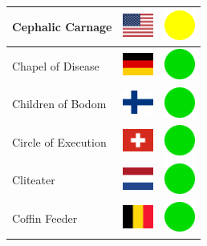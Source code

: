 \documentclass[12pt, a4paper, twoside]{report}
\begin{document}
\begin{center}
\begin{longtable}{|p{5cm}|p{2cm}|p{2cm}|}
 Cephalic Carnage                                           & \includegraphics[width=1cm]{4x3/us} &   \includegraphics[width=1cm]{likes/m} \\ \hline
 Chapel of Disease                                          & \includegraphics[width=1cm]{4x3/de} &   \includegraphics[width=1cm]{likes/y} \\ \hline
 Children of Bodom                                          & \includegraphics[width=1cm]{4x3/fi} &   \includegraphics[width=1cm]{likes/y} \\ \hline
 Circle of Execution                                        & \includegraphics[width=1cm]{4x3/ch} &   \includegraphics[width=1cm]{likes/y} \\ \hline
 Cliteater                                                  & \includegraphics[width=1cm]{4x3/nl} &   \includegraphics[width=1cm]{likes/y} \\ \hline
 Coffin Feeder                                              & \includegraphics[width=1cm]{4x3/be} &   \includegraphics[width=1cm]{likes/y} \\ \hline

\end{longtable}
\end{center}
\end{document}
